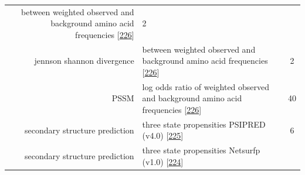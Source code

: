 \documentclass[11pt,a4paper,twoside]{book}
\theoremstyle{definition}
\theoremstyle{definition}
\theoremstyle{remark}
\begin{document}
\begin{longtable}[]{@{}rlc@{}}
\begin{minipage}[t]{0.50\columnwidth}
between weighted observed and background amino acid frequencies
{[}\protect\hyperlink{ref-Robinson1991}{226}{]}\strut
\end{minipage} & \begin{minipage}[t]{0.18\columnwidth}\centering\strut
2\strut
\end{minipage}\tabularnewline
\begin{minipage}[t]{0.23\columnwidth}\raggedleft\strut
jennson shannon divergence\strut
\end{minipage} & \begin{minipage}[t]{0.50\columnwidth}\raggedright\strut
between weighted observed and background amino acid frequencies
{[}\protect\hyperlink{ref-Robinson1991}{226}{]}\strut
\end{minipage} & \begin{minipage}[t]{0.18\columnwidth}\centering\strut
2\strut
\end{minipage}\tabularnewline
\begin{minipage}[t]{0.23\columnwidth}\raggedleft\strut
PSSM\strut
\end{minipage} & \begin{minipage}[t]{0.50\columnwidth}\raggedright\strut
log odds ratio of weighted observed and background amino acid
frequencies {[}\protect\hyperlink{ref-Robinson1991}{226}{]}\strut
\end{minipage} & \begin{minipage}[t]{0.18\columnwidth}\centering\strut
40\strut
\end{minipage}\tabularnewline
\begin{minipage}[t]{0.23\columnwidth}\raggedleft\strut
secondary structure prediction\strut
\end{minipage} & \begin{minipage}[t]{0.50\columnwidth}\raggedright\strut
three state propensities PSIPRED (v4.0)
{[}\protect\hyperlink{ref-Jones1999}{225}{]}\strut
\end{minipage} & \begin{minipage}[t]{0.18\columnwidth}\centering\strut
6\strut
\end{minipage}\tabularnewline
\begin{minipage}[t]{0.23\columnwidth}\raggedleft\strut
secondary structure prediction\strut
\end{minipage} & \begin{minipage}[t]{0.50\columnwidth}\raggedright\strut
three state propensities Netsurfp (v1.0)
{[}\protect\hyperlink{ref-Petersen2009a}{224}{]}\strut
\end{minipage} & \begin{minipage}[t]{0.18\columnwidth}\centering\strut

\end{minipage}
\end{longtable}
\end{document}
